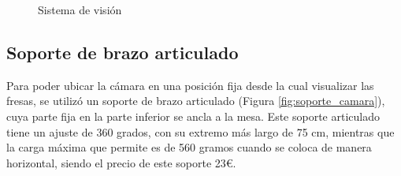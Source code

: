 \begin{figure}[H]
    \begin{center}
      \subcapcentertrue
      \hspace{5mm}
    \end{center}
    \caption{Sistema de visión}
    \label{fig:sistema_vision}
\end{figure}

\setcounter{footnote}{16}

\subsection{Soporte de brazo articulado}
\label{subsec:soporte_camara}

Para poder ubicar la cámara en una posición fija desde la cual visualizar las fresas, se utilizó un soporte de brazo articulado (Figura \ref{fig:soporte_camara}), cuya parte fija en la parte inferior se ancla a la mesa. Este soporte articulado tiene un ajuste de 360 grados, con su extremo más largo de 75 cm, mientras que la carga máxima que permite es de 560 gramos cuando se coloca de manera horizontal, siendo el precio de este soporte 23€.
 
